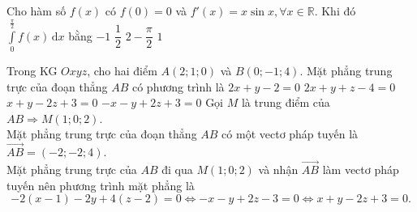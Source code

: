 \begin{ex}%
Cho hàm số $ f(x) $ có $ f(0)= 0 $ và  $ f'(x)=x\sin x, \forall x\in\mathbb{R} $. Khi đó $ \displaystyle\int\limits_0^{\frac{\pi}{2}} f(x)\mathrm{\,d}x $ bằng
\choice
{$ -1 $}
{$ \dfrac{1}{2} $}
{\True $ 2-\dfrac{\pi}{2} $}
{$ 1 $}
\end{ex}

\begin{ex}%
Trong KG $Oxyz$, cho hai điểm $A(2;1;0)$ và $B(0;-1;4)$. Mặt phẳng trung trực của đoạn thẳng $AB$ có phương trình là
\choice
{$2x+y-2=0$}
{$2x+y+z-4=0$}
{\True $x+y-2z+3=0$}
{$-x-y+2z+3=0$}
\loigiai
{
Gọi $M$ là trung điểm của $AB\Rightarrow M(1;0;2)$.\\
Mặt phẳng trung trực của đoạn thẳng $AB$ có một vectơ pháp tuyến là $\overrightarrow{AB}=(-2;-2;4)$.\\
Mặt phẳng trung trực của $AB$ đi qua $M(1;0;2)$ và nhận $\overrightarrow{AB}$ làm vectơ pháp tuyến nên phương trình mặt phẳng là $$-2(x-1)-2y+4(z-2)=0\Leftrightarrow -x-y+2z-3=0\Leftrightarrow x+y-2z+3=0.$$
}
\end{ex}


